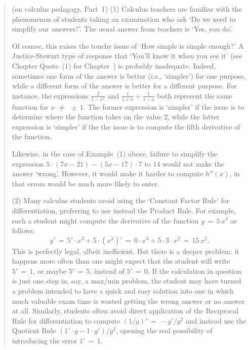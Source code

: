 \VV

\begin{quotation}
{\footnotesize \underline{\Notes} (on calculus pedagogy, Part~1)
(1) Calculus teachers are familiar with the phenomenon of students taking an examination who ask `Do we need to simplify our answers?'.
    The usual answer from teachers is `Yes, you do'.

        Of course, this raises the touchy issue of `How simple is simple enough?' A Justice-Stewart type of response that `You'll know it when you see it' (see Chapter Quote~(1) for Chapter~) is probably inadequate.
    Indeed, sometimes one form of the answer is  better (i.e., `simpler') for one purpose, while a different form of the answer is better for a different purpose.
    For instance, the expressions ${\displaystyle \frac{2}{1-x^{2}}}$ and ${\displaystyle \frac{1}{1+x} + \frac{1}{1-x}}$ both represent the same function for $x \,\,{\neq}\,\,  \,{\pm}\, 1$.
    The former expression is `simpler' if the issue is to determine where the function takes on the value $2$,
    while the latter expression is `simpler' if the the issue is to compute the fifth derivative of the function.

        Likewise, in the case of Example~(1) above, failure to simplify the expression $5{\cdot}(7x-21) - (5x-17){\cdot}7$ to $14$ would not make the answer `wrong'.
    However, it would make it harder to compute $h''(x)$, in that errors would be much more likely to enter.

\V

        (2) Many calculus students avoid using the `Constant Factor Rule' for differentiation,
    preferring to use instead the Product Rule. For example, such a student might compute the derivative of the function $y \,=\, 5\,x^{3}$ as follows:
        \begin{displaymath}
        y' \,=\, 5'{\cdot}x^{3} + 5{\cdot}(x^{3})' \,=\, 0{\cdot}x^{3} + 5{\cdot}3{\cdot}x^{2} \,=\, 15\,x^{2}.
        \end{displaymath}
    This is perfectly legal, albeit inefficient. But there is a deeper problem: it happens more often than one might expect that the student will write
    $5' \,=\, 1$, or maybe $5' \,=\, 5$, instead of $5' \,=\, 0$. If the calculation in question is just one step in, say, a max/min problem,
    the student may have turned a problem intended to have a quick and easy solution into one in which much valuable exam time is wasted getting the wrong answer or no answer at all.
    Similarly, students often avoid direct application of the Reciprocal Rule for differentiation to compute $(1/g)' \,=\, -g'/g^{2}$ and instead use the Quotient Rule $(1'{\cdot}g - 1{\cdot}g')/g^{2}$, opening the real possibility of introducing the error $1' \,=\, 1$.
}%
\end{quotation}

